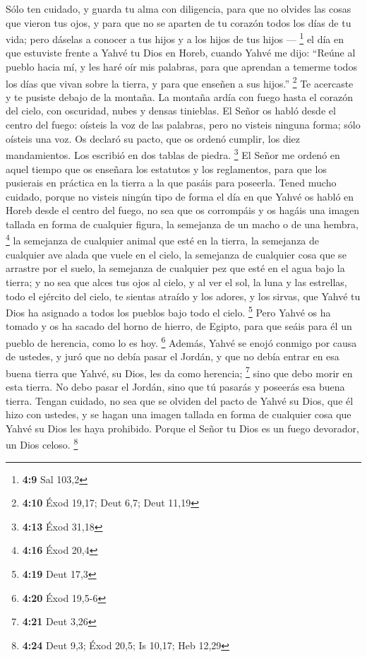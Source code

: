  Sólo ten cuidado, y guarda tu alma con diligencia, para
que no olvides las cosas que vieron tus ojos, y para que no se aparten
de tu corazón todos los días de tu vida; pero dáselas a conocer a tus
hijos y a los hijos de tus hijos --- \footnote{\textbf{4:9} Sal 103,2}
 el día en que estuviste frente a Yahvé tu Dios en Horeb,
cuando Yahvé me dijo: ``Reúne al pueblo hacia mí, y les haré oír mis
palabras, para que aprendan a temerme todos los días que vivan sobre la
tierra, y para que enseñen a sus hijos.'' \footnote{\textbf{4:10} Éxod
  19,17; Deut 6,7; Deut 11,19}  Te acercaste y te pusiste
debajo de la montaña. La montaña ardía con fuego hasta el corazón del
cielo, con oscuridad, nubes y densas tinieblas.  El Señor
os habló desde el centro del fuego: oísteis la voz de las palabras, pero
no visteis ninguna forma; sólo oísteis una voz.  Os
declaró su pacto, que os ordenó cumplir, los diez mandamientos. Los
escribió en dos tablas de piedra. \footnote{\textbf{4:13} Éxod 31,18}
 El Señor me ordenó en aquel tiempo que os enseñara los
estatutos y los reglamentos, para que los pusierais en práctica en la
tierra a la que pasáis para poseerla.  Tened mucho
cuidado, porque no visteis ningún tipo de forma el día en que Yahvé os
habló en Horeb desde el centro del fuego,  no sea que os
corrompáis y os hagáis una imagen tallada en forma de cualquier figura,
la semejanza de un macho o de una hembra, \footnote{\textbf{4:16} Éxod
  20,4}  la semejanza de cualquier animal que esté en la
tierra, la semejanza de cualquier ave alada que vuele en el cielo,
 la semejanza de cualquier cosa que se arrastre por el
suelo, la semejanza de cualquier pez que esté en el agua bajo la tierra;
 y no sea que alces tus ojos al cielo, y al ver el sol,
la luna y las estrellas, todo el ejército del cielo, te sientas atraído
y los adores, y los sirvas, que Yahvé tu Dios ha asignado a todos los
pueblos bajo todo el cielo. \footnote{\textbf{4:19} Deut 17,3}
 Pero Yahvé os ha tomado y os ha sacado del horno de
hierro, de Egipto, para que seáis para él un pueblo de herencia, como lo
es hoy. \footnote{\textbf{4:20} Éxod 19,5-6}  Además,
Yahvé se enojó conmigo por causa de ustedes, y juró que no debía pasar
el Jordán, y que no debía entrar en esa buena tierra que Yahvé, su Dios,
les da como herencia; \footnote{\textbf{4:21} Deut 3,26} 
sino que debo morir en esta tierra. No debo pasar el Jordán, sino que tú
pasarás y poseerás esa buena tierra.  Tengan cuidado, no
sea que se olviden del pacto de Yahvé su Dios, que él hizo con ustedes,
y se hagan una imagen tallada en forma de cualquier cosa que Yahvé su
Dios les haya prohibido.  Porque el Señor tu Dios es un
fuego devorador, un Dios celoso. \footnote{\textbf{4:24} Deut 9,3; Éxod
  20,5; Is 10,17; Heb 12,29}

